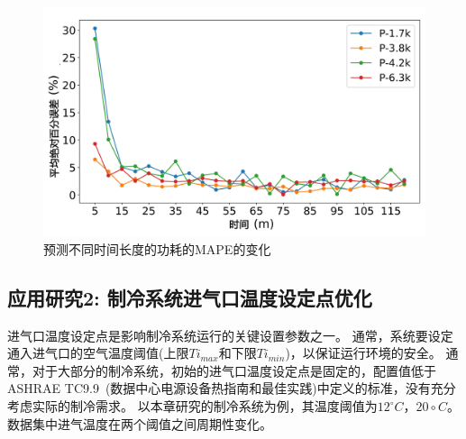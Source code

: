

\begin{figure}
    \centering
    \includegraphics[width=0.8\linewidth]{figures/chapter4/power_error.pdf}
    \caption{预测不同时间长度的功耗的MAPE的变化}
    \label{fig:mape_evolution}
\end{figure}




\subsection{应用研究2: 制冷系统进气口温度设定点优化}
\label{sub:case-study2}
进气口温度设定点是影响制冷系统运行的关键设置参数之一。
通常，系统要设定通入进气口的空气温度阈值(上限$Ti_{max}$和下限$Ti_{min}$)，以保证运行环境的安全。
通常，对于大部分的制冷系统，初始的进气口温度设定点是固定的，配置值低于ASHRAE TC9.9~\cite{ashraeTC992011}(数据中心电源设备热指南和最佳实践)中定义的标准，没有充分考虑实际的制冷需求。
以本章研究的制冷系统为例，其温度阈值为$12^\circ C$，$20\circ C$。
数据集中进气温度在两个阈值之间周期性变化。

